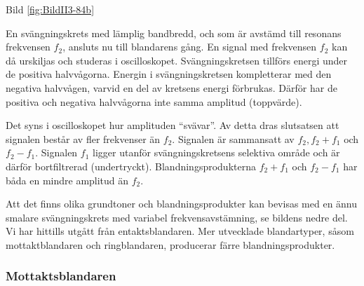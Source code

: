Bild \ref{fig:BildII3-84b}

En svängningskrets med lämplig bandbredd, och som är avstämd till
resonans frekvensen \(f_2\), ansluts nu till blandarens gång. En
signal med frekvensen \(f_2\) kan då urskiljas och studeras i
oscilloskopet. Svängningskretsen tillförs energi under de positiva
halvvågorna. Energin i svängningskretsen kompletterar med den negativa
halvvågen, varvid en del av kretsens energi förbrukas.  Därför har de
positiva och negativa halvvågorna inte samma amplitud (toppvärde).

Det syns i oscilloskopet hur amplituden ``svävar''. Av detta dras
slutsatsen att signalen består av fler frekvenser än \(f_2\). Signalen
är sammansatt av \(f_2, f_2+f_1\) och \(f_2-f_1\). Signalen \(f_1\)
ligger utanför svängningskretsens selektiva område och är därför
bortfiltrerad (undertryckt). Blandningsprodukterna \(f_2 + f_1\) och
\(f_2 - f_1\) har båda en mindre amplitud än \(f_2\).

Att det finns olika grundtoner och blandningsprodukter kan bevisas med
en ännu smalare svängningskrets med variabel frekvensavstämning, se
bildens nedre del.  Vi har hittills utgått från entaktsblandaren.  Mer
utvecklade blandartyper, såsom mottaktblandaren och ringblandaren,
producerar färre blandningsprodukter.

\subsubsection{Mottaktsblandaren}

